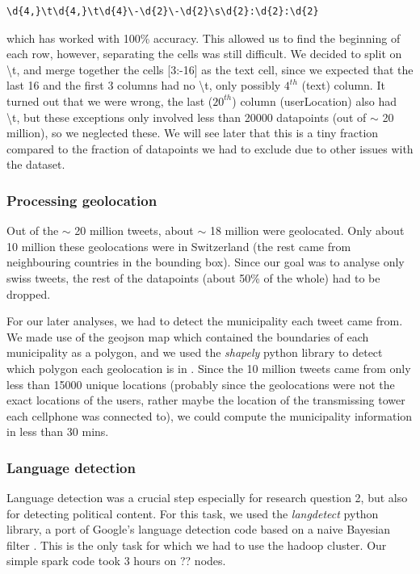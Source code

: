 \begin{Verbatim}[frame=single,fontsize=\scriptsize]
  \d{4,}\t\d{4,}\t\d{4}\-\d{2}\-\d{2}\s\d{2}:\d{2}:\d{2}
\end{Verbatim}

which has worked with 100\% accuracy. This allowed us to find the beginning of each row, however, separating the cells was still difficult. We decided to split on \textbackslash t, and merge together the cells [3:-16] as the text cell, since we expected that the last 16 and the first 3 columns had no \textbackslash t, only possibly $4^{th}$ (text) column. It turned out that we were wrong, the last ($20^{th}$) column (userLocation) also had \textbackslash t, but these exceptions only involved less than 20000 datapoints (out of $\sim$ 20 million), so we neglected these. We will see later that this is a tiny fraction compared to the fraction of datapoints we had to exclude due to other issues with the dataset.

\subsubsection{Processing geolocation}
\label{pre_geo}

Out of the $\sim$ 20 million tweets, about $\sim$ 18 million were geolocated. Only about 10 million these geolocations were in Switzerland (the rest came from neighbouring countries in the bounding box). Since our goal was to analyse only swiss tweets, the rest of the datapoints (about 50\% of the whole) had to be dropped.

For our later analyses, we had to detect the municipality each tweet came from. We made use of the geojson map which contained the boundaries of each  municipality as a polygon, and we used the \textit{shapely} python library to detect which polygon each geolocation is in \cite{shapely}. Since the 10 million tweets came from only less than 15000 unique locations (probably since the geolocations were not the exact locations of the users, rather maybe the location of the transmissing tower each cellphone was connected to), we could compute the municipality information in less than 30 mins.



\subsubsection{Language detection}

Language detection was a crucial step especially for research question 2, but also for detecting political content. For this task, we used the \textit{langdetect} python library, a port of Google's language detection code based on a naive Bayesian filter \cite{langdetect}. This is the only task for which we had to use the hadoop cluster. Our simple spark code took 3 hours on ?? nodes.

